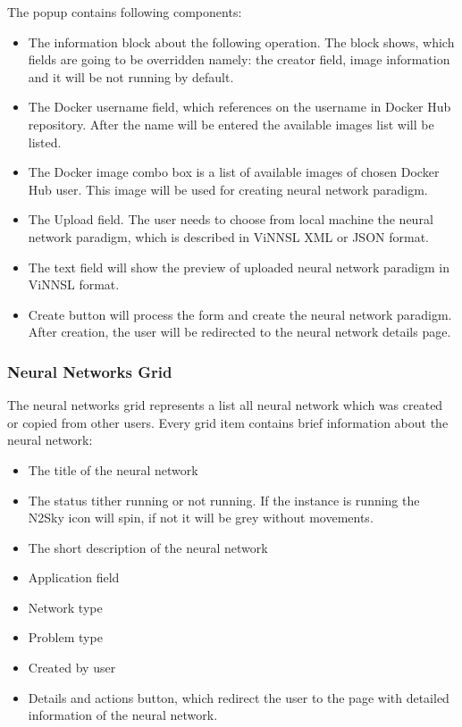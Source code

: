 \begin{itemize}
The popup contains following components:
\begin{itemize}
\item The information block about the following operation. The block shows, which fields are going to be overridden namely: the creator field, image information and it will be not running by default. 
\item The Docker username field, which references on the username in Docker Hub repository. After the name will be entered the available images list will be listed. 
\item The Docker image combo box is a list of available images of chosen Docker Hub user.  This image will be used for creating neural network paradigm.
\item The Upload field. The user needs to choose from local machine the neural network paradigm, which is described in ViNNSL XML or JSON format.
\item The text field will show the preview of uploaded neural network paradigm in ViNNSL format.
\item Create button will process the form and create the neural network paradigm. After creation, the user will be redirected to the neural network details page. 
\end{itemize}

\subsubsection{Neural Networks Grid}

The neural networks grid represents a list all neural network which was created or copied from other users. Every grid item contains brief information about the neural network:
\begin{itemize}
\item The title of the neural network
\item The status tither running or not running. If the instance is running the N2Sky icon will spin, if not it will be grey without movements. 
\item The short description of the neural network
\item Application field
\item Network type
\item Problem type
\item Created by user
\item Details and actions button, which redirect the user to the page with detailed information of the neural network. 
\end{itemize}


\end{itemize}
